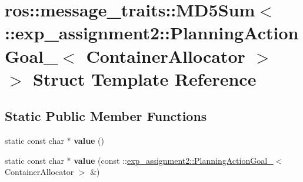 \hypertarget{structros_1_1message__traits_1_1MD5Sum_3_01_1_1exp__assignment2_1_1PlanningActionGoal___3_01ContainerAllocator_01_4_01_4}{}\section{ros\+:\+:message\+\_\+traits\+:\+:M\+D5\+Sum$<$ \+:\+:exp\+\_\+assignment2\+:\+:Planning\+Action\+Goal\+\_\+$<$ Container\+Allocator $>$ $>$ Struct Template Reference}
\label{structros_1_1message__traits_1_1MD5Sum_3_01_1_1exp__assignment2_1_1PlanningActionGoal___3_01ContainerAllocator_01_4_01_4}
\subsection*{Static Public Member Functions}
\begin{DoxyCompactItemize}
\item 
\mbox{\label{structros_1_1message__traits_1_1MD5Sum_3_01_1_1exp__assignment2_1_1PlanningActionGoal___3_01ContainerAllocator_01_4_01_4_a6f965ef98373ab36cf96147dd46cc9f2}} 
static const char $\ast$ {\bfseries value} ()
\item 
\mbox{\label{structros_1_1message__traits_1_1MD5Sum_3_01_1_1exp__assignment2_1_1PlanningActionGoal___3_01ContainerAllocator_01_4_01_4_aa0fed80cb120f2222dceddb76c372a12}} 
static const char $\ast$ {\bfseries value} (const \+::\hyperlink{structexp__assignment2_1_1PlanningActionGoal__}{exp\+\_\+assignment2\+::\+Planning\+Action\+Goal\+\_\+}$<$ Container\+Allocator $>$ \&)
\end{DoxyCompactItemize}

